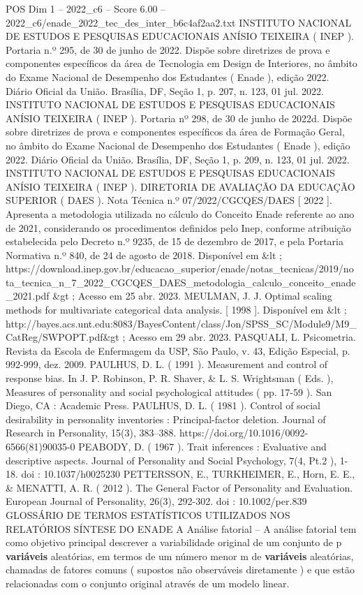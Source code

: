 \begin{textsample}{POS Dim 1 – 2022\_c6 – Score 6.00 – 2022\_c6/enade\_2022\_tec\_des\_inter\_b6c4af2aa2.txt}
INSTITUTO NACIONAL DE ESTUDOS E PESQUISAS EDUCACIONAIS ANÍSIO TEIXEIRA ( INEP ).
Portaria n.º 295, de 30 de junho de 2022.
Dispõe sobre diretrizes de prova e componentes específicos da área de Tecnologia em Design de Interiores, no âmbito do Exame Nacional de Desempenho dos Estudantes ( Enade ), edição 2022.
Diário Oficial da União.
Brasília, DF, Seção 1, p. 207, n. 123, 01 jul. 2022.
INSTITUTO NACIONAL DE ESTUDOS E PESQUISAS EDUCACIONAIS ANÍSIO TEIXEIRA ( INEP ).
Portaria nº 298, de 30 de junho de 2022d.
Dispõe sobre diretrizes de prova e componentes específicos da área de Formação Geral, no âmbito do Exame Nacional de Desempenho dos Estudantes ( Enade ), edição 2022.
Diário Oficial da União.
Brasília, DF, Seção 1, p. 209, n. 123, 01 jul. 2022.
INSTITUTO NACIONAL DE ESTUDOS E PESQUISAS EDUCACIONAIS ANÍSIO TEIXEIRA ( INEP ).
DIRETORIA DE AVALIAÇÃO DA EDUCAÇÃO SUPERIOR ( DAES ).
Nota Técnica n.º 07/2022/CGCQES/DAES [ 2022 ].
Apresenta a metodologia utilizada no cálculo do Conceito Enade referente ao ano de 2021, considerando os procedimentos definidos pelo Inep, conforme atribuição estabelecida pelo Decreto n.º 9235, de 15 de dezembro de 2017, e pela Portaria Normativa n.º 840, de 24 de agosto de 2018.
Disponível em \&lt ; https://download.inep.gov.br/educacao\_superior/enade/notas\_tecnicas/2019/nota\_tecnica\_n\_7\_2022\_CGCQES\_DAES\_metodologia\_calculo\_conceito\_enade\_2021.pdf \&gt ; Acesso em 25 abr. 2023.
MEULMAN, J.
J.
Optimal scaling methods for multivariate categorical data analysis. [ 1998 ].
Disponível em \&lt ; http://bayes.acs.unt.edu:8083/BayesContent/class/Jon/SPSS\_SC/Module9/M9\_CatReg/SWPOPT.pdf\&gt ; Acesso em 29 abr. 2023.
PASQUALI, L.
Psicometria.
Revista da Escola de Enfermagem da USP, São Paulo, v. 43, Edição Especial, p. 992-999, dez. 2009.
PAULHUS, D.
L. ( 1991 ).
Measurement and control of response bias.
In J.
P.
Robinson, P.
R.
Shaver, \& L.
S.
Wrightsman ( Eds. ), Measures of personality and social psychological attitudes ( pp. 17-59 ).
San Diego, CA : Academic Press.
PAULHUS, D.
L. ( 1981 ).
Control of social desirability in personality inventories : Principal-factor deletion.
Journal of Research in Personality, 15(3), 383–388. https://doi.org/10.1016/0092-6566(81)90035-0 PEABODY, D. ( 1967 ).
Trait inferences : Evaluative and descriptive aspects.
Journal of Personality and Social Psychology, 7(4, Pt.2 ), 1-18. doi : 10.1037/h0025230 PETTERSSON, E., TURKHEIMER, E., Horn, E.
E., \& MENATTI, A.
R. ( 2012 ).
The General Factor of Personality and Evaluation.
European Journal of Personality, 26(3), 292-302. doi : 10.1002/per.839 GLOSSÁRIO DE TERMOS ESTATÍSTICOS UTILIZADOS NOS RELATÓRIOS SÍNTESE DO ENADE A Análise fatorial – A análise fatorial tem como objetivo principal descrever a variabilidade original de um conjunto de p \textbf{variáveis} aleatórias, em termos de um número menor m de \textbf{variáveis} aleatórias, chamadas de fatores comuns ( supostos não observáveis diretamente ) e que estão relacionadas com o conjunto original através de um modelo linear.

\end{textsample}
